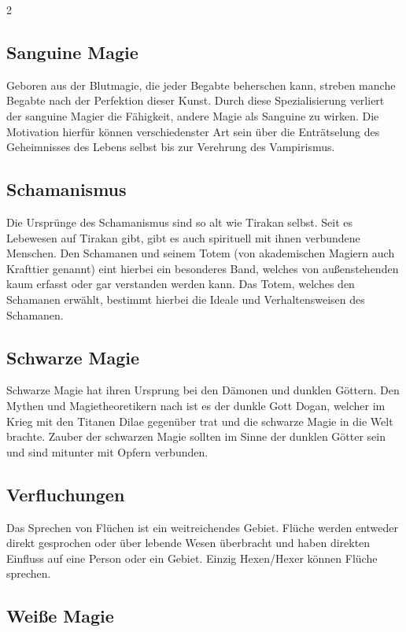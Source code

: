 \begin{multicols}{2}
{\subsection{Sanguine Magie}\label{subsec:sanguine-magie}

Geboren aus der Blutmagie, die jeder Begabte beherschen kann, streben manche Begabte nach der Perfektion dieser Kunst.
Durch diese Spezialisierung verliert der sanguine Magier die Fähigkeit, andere Magie als Sanguine zu wirken.
Die Motivation hierfür können verschiedenster Art sein über die Enträtselung des Geheimnisses des Lebens selbst bis zur Verehrung des Vampirismus.

\subsection{Schamanismus}\label{subsec:schamanismus}

Die Ursprünge des Schamanismus sind so alt wie Tirakan selbst.
Seit es Lebewesen auf Tirakan gibt, gibt es auch spirituell mit ihnen verbundene Menschen.
Den Schamanen und seinem Totem (von akademischen Magiern auch Krafttier genannt) eint hierbei ein besonderes Band, welches von außenstehenden kaum erfasst oder gar verstanden werden kann.
Das Totem, welches den Schamanen erwählt, bestimmt hierbei die Ideale und Verhaltensweisen des Schamanen.

\subsection{Schwarze Magie}\label{subsec:schwarze-magie}

Schwarze Magie hat ihren Ursprung bei den Dämonen und dunklen Göttern.
Den Mythen und Magietheoretikern nach ist es der dunkle Gott Dogan, welcher im Krieg mit den Titanen Dilae gegenüber trat und die schwarze Magie in die Welt brachte.
Zauber der schwarzen Magie sollten im Sinne der dunklen Götter sein und sind mitunter mit Opfern verbunden.

\subsection{Verfluchungen}\label{subsec:verfluchungen}

Das Sprechen von Flüchen ist ein weitreichendes Gebiet.
Flüche werden entweder direkt gesprochen oder über lebende Wesen überbracht und haben direkten Einfluss auf eine Person oder ein Gebiet.
Einzig Hexen/Hexer können Flüche sprechen.

\subsection{Weiße Magie}\label{subsec:weie-magie}

}
\end{multicols}
